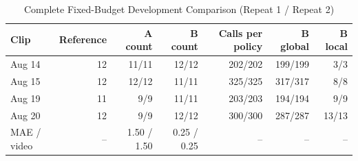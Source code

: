 \begin{table}[!t]
\caption{Complete Fixed-Budget Development Comparison (Repeat 1 / Repeat 2)}
\label{tab:budget}
\centering\small
\begin{tabular}{lrrrrrr}
\toprule
Clip & Reference & A count & B count & Calls per policy & B global & B local\\
\midrule
Aug 14 & 12 & 11/11 & 12/12 & 202/202 & 199/199 & 3/3\\
Aug 15 & 12 & 12/12 & 11/11 & 325/325 & 317/317 & 8/8\\
Aug 19 & 11 & 9/9 & 11/11 & 203/203 & 194/194 & 9/9\\
Aug 20 & 12 & 9/9 & 12/12 & 300/300 & 287/287 & 13/13\\
\midrule
MAE / video & -- & 1.50 / 1.50 & 0.25 / 0.25 & -- & -- & --\\
\bottomrule
\end{tabular}
\end{table}
